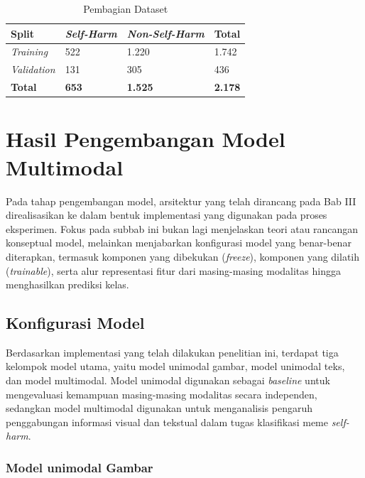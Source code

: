 \begin{table}[H]
    \centering
    \caption{Pembagian Dataset}
    \label{table:4.datasplit}
    \small
    \setlength{\tabcolsep}{3pt}
    \renewcommand{\arraystretch}{1.1}
    \begin{tabular}{p{2.1cm} p{2cm} p{2cm} p{1.2cm}}
        \hline
        \textbf{Split} & \textbf{\textit{Self-Harm}} & \textbf{\textit{Non-Self-Harm}} & \textbf{Total} \\
        \hline
        \textit{Training} & 522 & 1.220 & 1.742 \\
        \textit{Validation} & 131 & 305 & 436 \\
        \textbf{Total} & \textbf{653} & \textbf{1.525} & \textbf{2.178} \\
        \hline
    \end{tabular}
\end{table}

\section{Hasil Pengembangan Model Multimodal} \label{IV.Model}
Pada tahap pengembangan model, arsitektur yang telah dirancang pada Bab III direalisasikan ke dalam bentuk implementasi yang digunakan pada proses eksperimen. Fokus pada subbab ini bukan lagi menjelaskan teori atau rancangan konseptual model, melainkan menjabarkan konfigurasi model yang benar-benar diterapkan, termasuk komponen yang dibekukan (\textit{freeze}), komponen yang dilatih (\textit{trainable}), serta alur representasi fitur dari masing-masing modalitas hingga menghasilkan prediksi kelas.

\subsection{Konfigurasi Model} \label{IV.Model.Konfigurasi}
Berdasarkan implementasi yang telah dilakukan penelitian ini, terdapat tiga kelompok model utama, yaitu model unimodal gambar, model unimodal teks, dan model multimodal. Model unimodal digunakan sebagai \textit{baseline} untuk mengevaluasi kemampuan masing-masing modalitas secara independen, sedangkan model multimodal digunakan untuk menganalisis pengaruh penggabungan informasi visual dan tekstual dalam tugas klasifikasi meme \textit{self-harm}.


\subsubsection{Model unimodal Gambar}
\label{IV.Model.Konfigurasi.UnimodalGambar}

